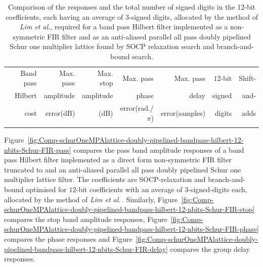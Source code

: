 \documentclass[a4paper,twoside,10pt,english]{article}
\begin{document}
\begin{table}
\centering
\begin{threeparttable}
\begin{tabular}{lrrrrrrr} \\ \toprule
&Band pass&Max. pass&Max. stop&Max. pass        &Max. pass     &$12$-bit&Shift-\\
&Hilbert  &amplitude&amplitude&phase            &delay         &signed  &and-  \\
&cost     &error(dB)&(dB)     &error(rad./$\pi$)&error(samples)&digits  &adds  \\
\midrule

\\ \bottomrule
\end{tabular}
\end{threeparttable}
\caption[Comparison of band pass Hilbert filter FIR and Schur lattice implementations]
{Comparison of the responses and the total number of signed digits in the
  12-bit coefficients, each having an average of 3-signed digits, allocated by
  the method of \emph{Lim et al.}, required for a band pass Hilbert filter
  implemented as a non-symmetric FIR filter and as an anti-aliased parallel all
  pass doubly pipelined Schur one multiplier lattice found by SOCP relaxation
  search and branch-and-bound search.}
\label{tab:Comp-schurOneMPAlattice-doubly-pipelined-bandpass-hilbert-12-nbits-Schur-FIR-cost}
\end{table}

Figure~\ref{fig:Comp-schurOneMPAlattice-doubly-pipelined-bandpass-hilbert-12-nbits-Schur-FIR-pass}
compares the pass band amplitude responses of a band pass Hilbert
filter implemented as a direct form non-symmetric FIR filter truncated to
and an anti-aliased parallel all pass doubly pipelined Schur one multiplier 
lattice filter. The coefficients are SOCP-relaxation and branch-and-bound
optimised for $12$-bit coefficients with an average of
$3$-signed-digits each, allocated by the method of \emph{Lim et al.}\,.
Similarly,
Figure~\ref{fig:Comp-schurOneMPAlattice-doubly-pipelined-bandpass-hilbert-12-nbits-Schur-FIR-stop}
compares the stop band amplitude responses,
Figure~\ref{fig:Comp-schurOneMPAlattice-doubly-pipelined-bandpass-hilbert-12-nbits-Schur-FIR-phase}
compares the phase responses and
Figure~\ref{fig:Comp-schurOneMPAlattice-doubly-pipelined-bandpass-hilbert-12-nbits-Schur-FIR-delay}
compares the group delay responses.
\end{document}
